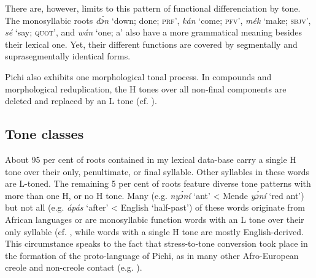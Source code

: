 
There are, however, limits to this pattern of functional differenciation by tone. The monosyllabic roots \textit{dɔ́n} ‘down; done; \textsc{prf’}, \textit{kán} ‘come; \textsc{pfv’,} \textit{mék} ‘make; \textsc{sbjv}’, \textit{sé} ‘say; \textsc{quot’,} and \textit{wán} ‘one; a’ also have a more grammatical meaning besides their lexical one. Yet, their different functions are covered by segmentally and suprasegmentally identical forms. 


Pichi also exhibits one morphological tonal process. In compounds and morphological reduplication, the H tones over all non-final components are deleted and replaced by an L tone (cf. ).


\subsection{Tone classes}\label{sec:3.1.3}

About 95 per cent of roots contained in my lexical data-base carry a single H tone over their only, penultimate, or final syllable. Other syllables in these words are L-toned. The remaining 5 per cent of roots feature diverse tone patterns with more than one H, or no H tone. Many (e.g. \textit{nyɔ́ní} ‘ant’ < Mende \textit{yɔ́ní} ‘red ant’) but not all (e.g. \textit{ápás} ‘after’ < English ‘half-past’) of these words originate from African languages or are monosyllabic function words with an L tone over their only syllable (cf. , while words with a single H tone are mostly English-derived. This circumstance speaks to the fact that stress-to-tone conversion took place in the formation of the proto-language of Pichi, as in many other Afro-European creole and non-creole contact (e.g. \citealt{Berry1970,Criper1971,Criper-Friedman1990,Alleyne1980,GussenhovenUdofot2010,Steien2015}). 

